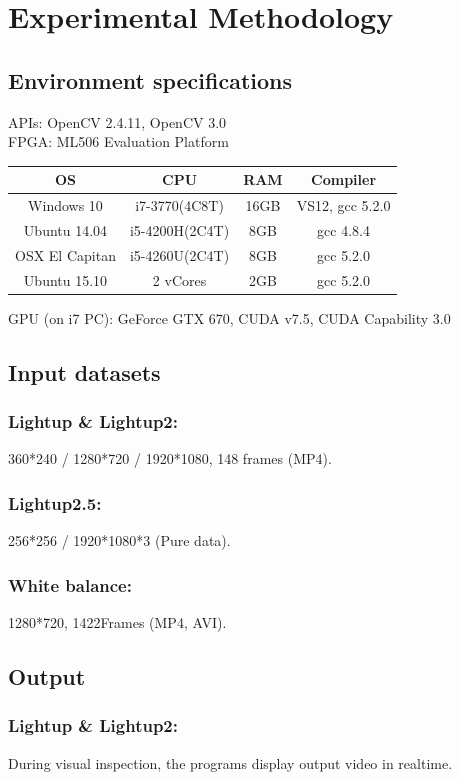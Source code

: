 \documentclass{acm_proc_article-sp}
\begin{document}
\section{Experimental Methodology}
\subsection{Environment specifications}
APIs: OpenCV 2.4.11, OpenCV 3.0 \\
FPGA: ML506 Evaluation Platform \\
\begin{table}[H]
\centering
\begin{tabular}{|c|c|c|c|} \hline
OS&CPU&RAM&Compiler\\ \hline
Windows 10 & i7-3770(4C8T) & 16GB & VS12, gcc 5.2.0 \\ \hline
Ubuntu 14.04 & i5-4200H(2C4T) & 8GB & gcc 4.8.4 \\ \hline
OSX El Capitan & i5-4260U(2C4T) & 8GB & gcc 5.2.0\\ \hline
Ubuntu 15.10 & 2 vCores & 2GB & gcc 5.2.0 \\ \hline
\end{tabular}
\end{table}
GPU (on i7 PC): GeForce GTX 670, CUDA v7.5, CUDA Capability 3.0
\subsection{Input datasets}
\subsubsection{Lightup \& Lightup2:}
 360*240 / 1280*720 / 1920*1080, 148 frames (MP4). \\
\subsubsection{Lightup2.5:}
 256*256 / 1920*1080*3 (Pure data). \\
\subsubsection{White balance:}
 1280*720, 1422Frames (MP4, AVI). \\

\subsection{Output}
\subsubsection{Lightup \& Lightup2:}
During visual inspection, the programs display output video in realtime.
\end{document}

